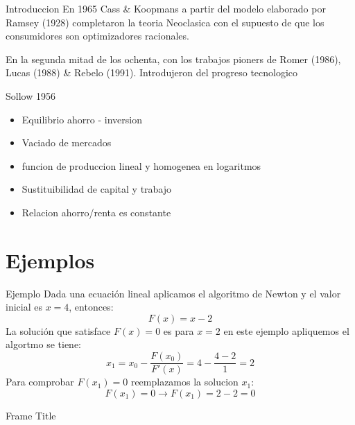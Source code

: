 \documentclass[t,11pt]{beamer}
\begin{document}
 \begin{frame}{Introduccion}
 En 1965 Cass \& Koopmans a partir del modelo elaborado por Ramsey (1928) completaron la teoria Neoclasica con el supuesto de que los consumidores son optimizadores racionales.
 \medskip
 
 En la segunda mitad de los ochenta, con los trabajos pioners de Romer (1986), Lucas (1988) \& Rebelo (1991). Introdujeron del progreso tecnologico
 
 \end{frame}
\begin{frame}{Sollow 1956}
\begin{itemize}
    \item Equilibrio ahorro - inversion
    \item Vaciado de mercados
    \item funcion de produccion lineal y homogenea en logaritmos
    \item Sustituibilidad de capital y trabajo
    \item Relacion ahorro/renta es constante
\end{itemize}
    
\end{frame}

\section{Ejemplos}

\begin{frame}{Ejemplo}
Dada una ecuación lineal aplicamos el algoritmo de Newton y el valor inicial es $x=4$, entonces:
$$F(x)=x-2$$
La solución que satisface $F(x)=0$ es para $x=2$ en este ejemplo apliquemos el algortmo se tiene:
$$x_1 = x_0 - \frac{F(x_0)}{F'(x)}=4-\frac{4-2}{1}=2$$
Para comprobar $F(x_1)=0$ reemplazamos la solucion $x_1$:
$$F(x_1)=0 \rightarrow F(x_1)=2-2=0$$
\end{frame}
\begin{frame}{Frame Title}
    
\end{frame}
 
\end{document}
